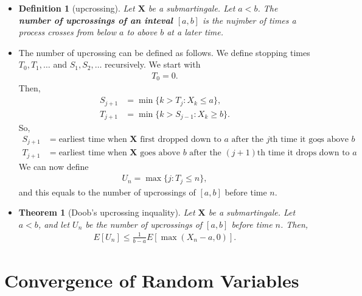 \documentclass[10pt]{article}
\newtheorem{theorem}[lemma]{Theorem}
\newtheorem{definition}[lemma]{Definition}
\numberwithin{lemma}{section}
\newcommand{\ve}[1]{\mathbf{#1}}
\begin{document}
\begin{itemize}
  \item \begin{definition}[upcrossing]
    Let $\ve{X}$ be a submartingale. Let $a < b$. The {\bf number of upcrossings of an inteval $[a,b]$} is the nujmber of times a process crosses from below $a$ to above $b$ at a later time.
  \end{definition}

  \item The number of upcrossing can be defined as follows. We define stopping times $T_0, T_1, \dotsc$ and $S_1, S_2, \dotsc$ recursively. We start with
  \begin{align*}
    T_0 = 0.
  \end{align*}
  Then,
  \begin{align*}
    S_{j+1} &= \min\{ k > T_j : X_k \leq a \}, \\
    T_{j+1} &= \min\{ k > S_{j-1}: X_k \geq b \}.
  \end{align*}
  So,
  \begin{align*}
    S_{j+1} &= \mbox{earliest time when $\ve{X}$ first dropped down to $a$ after the $j$th time it goes above $b$}, \\
    T_{j+1} &= \mbox{earliest time when $\ve{X}$ goes above $b$ after the $(j+1)$th time it drops down to $a$}.
  \end{align*}
  We can now define
  \begin{align*}
    U_n = \max\{j : T_j \leq n\},
  \end{align*}
  and this equals to the number of upcrossings of $[a,b]$ before time $n$.

  \item \begin{theorem}[Doob's upcrossing inquality]
    Let $\ve{X}$ be a submartingale. Let $a < b$, and let $U_n$ be the number of upcrossings of $[a,b]$ before time $n$. Then,
    \begin{align*}
      E[U_n] \leq \frac{1}{b-a} E[\max(X_n - a, 0)].
    \end{align*}
  \end{theorem}
\end{itemize}

\section{Convergence of Random Variables}
\end{document}
